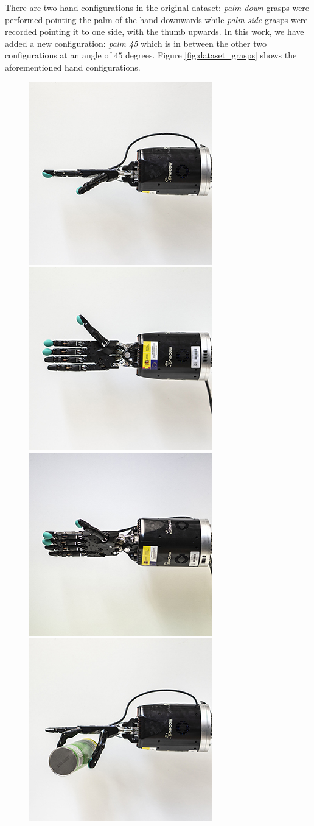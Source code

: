 There are two hand configurations in the original dataset: \textit{palm down} grasps were performed pointing the palm of the hand downwards while \textit{palm side} grasps were recorded pointing it to one side, with the thumb upwards. In this work, we have added a new configuration: \emph{palm 45} which is in between the other two configurations at an angle of $45$ degrees. Figure \ref{fig:dataset_grasps} shows the aforementioned hand configurations.

\begin{figure}[!htb]
	\centering
    \includegraphics[width=0.32\linewidth]{Figures/Tactile/dataset/palmdown-downsampled}
    \includegraphics[width=0.32\linewidth]{Figures/Tactile/dataset/palmside-downsampled}
    \includegraphics[width=0.32\linewidth]{Figures/Tactile/dataset/palm45-downsampled}\\
    \smallskip
    \includegraphics[width=0.32\linewidth]{Figures/Tactile/dataset/palmdown_grasp-downsampled}

\end{figure}

